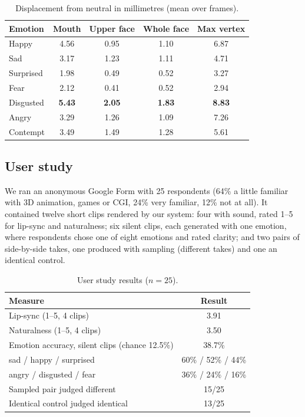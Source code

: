 \documentclass[10pt,twocolumn,letterpaper]{article}
\begin{document}
\begin{table}[t]
\centering\small
\caption{Displacement from neutral in millimetres (mean over frames).}
\label{tab:disp}
\begin{tabular}{@{}lcccc@{}}
\toprule
Emotion & Mouth & Upper face & Whole face & Max vertex\\
\midrule
Happy & 4.56 & 0.95 & 1.10 & 6.87\\
Sad & 3.17 & 1.23 & 1.11 & 4.71\\
Surprised & 1.98 & 0.49 & 0.52 & 3.27\\
Fear & 2.12 & 0.41 & 0.52 & 2.94\\
Disgusted & \textbf{5.43} & \textbf{2.05} & \textbf{1.83} & \textbf{8.83}\\
Angry & 3.29 & 1.26 & 1.09 & 7.26\\
Contempt & 3.49 & 1.49 & 1.28 & 5.61\\
\bottomrule
\end{tabular}
\end{table}

\subsection{User study}
We ran an anonymous Google Form with 25 respondents (64\% a little familiar with 3D animation, games or CGI, 24\% very familiar, 12\% not at all). It contained twelve short clips rendered by our system: four with sound, rated 1--5 for lip-sync and naturalness; six silent clips, each generated with one emotion, where respondents chose one of eight emotions and rated clarity; and two pairs of side-by-side takes, one produced with sampling (different takes) and one an identical control.

\begin{table}[t]
\centering\small
\caption{User study results ($n{=}25$).}
\label{tab:survey}
\begin{tabular}{@{}lc@{}}
\toprule
Measure & Result\\
\midrule
Lip-sync (1--5, 4 clips) & 3.91\\
Naturalness (1--5, 4 clips) & 3.50\\
Emotion accuracy, silent clips (chance 12.5\%) & 38.7\%\\
\quad sad / happy / surprised & 60\% / 52\% / 44\%\\
\quad angry / disgusted / fear & 36\% / 24\% / 16\%\\
Sampled pair judged different & 15/25\\
Identical control judged identical & 13/25\\
\bottomrule
\end{tabular}
\end{table}
\end{document}
